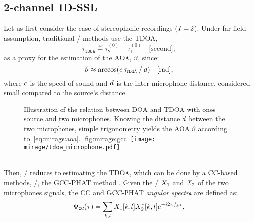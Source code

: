 \subsection{2-channel 1D-SSL}\label{subsec:mirage:1D-SSL}
\newcommand{\tdoa}{\ensuremath{\tau_\mathtt{TDOA}}}
\newcommand{\aoa}{\ensuremath{\vartheta}}
Let us first consider the case of stereophonic recordings ($I=2$).
Under far-field assumption, traditional \SSL/ methods use the \acf{TDOA},
\begin{equation*}
    \tdoa \eqdef \tau^{(0)}_2 - \tau^{(0)}_1\quad\text{[second]}
    ,
\end{equation*}
as a proxy for the estimation of the \ac{AOA}, $\aoa$, since:
\begin{equation}\label{eq:mirage:aoa}
    \vartheta \approx \arccos \kparen{\speedOfSound \: \tdoa \: / \: \distMicMic }\quad\text{[rad]},
\end{equation}
where $c$ is the speed of sound and $d$ is the inter-microphone distance, considered small compared to the source's distance.
\begin{figure}
    \begin{sidecaption}[]{
        Illustration of the relation between \ac{DOA} and \ac{TDOA} with ones source and two microphones.
        Knowing the distance $d$ between the two microphones, simple trigonometry yields the \ac{AOA} $\vartheta$ according to~\cref{eq:mirage:aoa}.
    }[fig:mirage:gcc]
        \texttt{[image: mirage/tdoa\_microphone.pdf]}
    \end{sidecaption}
\end{figure}
\\Then, \SSL/ reduces to estimating the \ac{TDOA}, which can be done by a \ac{CC}-based methods, \eg/, the \acf{GCC-PHAT} method .
Given the \STFT/ $X_1$ and $X_2$ of the two microphones signals, the \ac{CC} and \ac{GCC-PHAT} \textit{angular spectra} are defined as:
\begin{equation}\label{eq:mirage:cc}
    \Psi_\mathtt{CC}(\tau) = \sum_{k,l} X_1[k,l] X_2^{*}[k,l] {e}^{-{i} 2  \pi f_k \tau}
    ,
    \end{equation}
